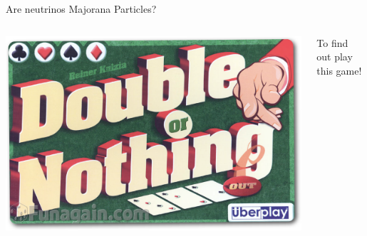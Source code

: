 \documentclass [aspectratio=169]{beamer}
\begin{document}



\begin{frame}{Are neutrinos Majorana Particles?}

\begin{columns}
\includegraphics[scale=0.35]{DoubleOrNothing.png}

To find out play this game!   
\end{columns}
\end{frame}

\end{document}
